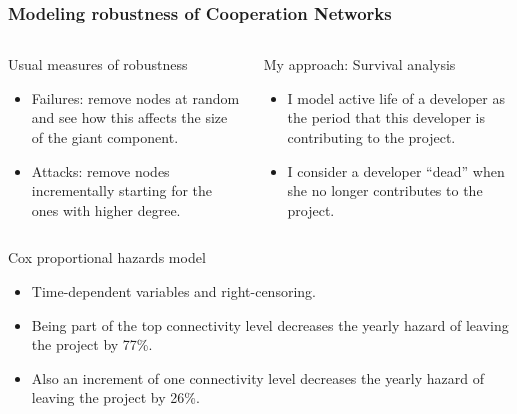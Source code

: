 \documentclass[ignorenonframetext,red,8pt,notes=hide]{beamer}
\begin{document}
\begin{frame}
\frametitle{Modeling robustness of Cooperation Networks}

\begin{columns}[c]
\begin{column}{0.5\textwidth}
\begin{block}{Usual measures of robustness}
\begin{itemize}
\item Failures: remove nodes at random and see how this affects the size of the giant component.  
\item Attacks: remove nodes incrementally starting for the ones with higher degree.
\end{itemize}
\end{block}
\end{column}

\pause

\begin{column}{0.5\textwidth}

\begin{block}{My approach: Survival analysis}
\begin{itemize}
\item I model active life of a developer as the period that this developer is contributing to the project.
\item I consider a developer ``dead'' when she no longer contributes to the project.
\end{itemize}
\end{block}
\end{column}
\end{columns}

\pause

\begin{block}{Cox proportional hazards model}
\begin{itemize}
\item Time-dependent variables and right-censoring.
\item Being part of the top connectivity level decreases the yearly hazard of leaving the project by 77\%.
\item Also an increment of one connectivity level decreases the yearly hazard of leaving the project by 26\%.
\end{itemize}
\end{block}


\end{frame}
\end{document}
